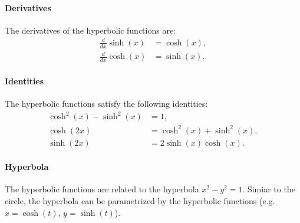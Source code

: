 \documentclass[11pt]{article}
\begin{document}
\paragraph{Derivatives} The derivatives of the hyperbolic functions are:
\begin{align}
    \frac{d}{dx} \sinh(x) &= \cosh(x), \\
    \frac{d}{dx} \cosh(x) &= \sinh(x).
\end{align}
\paragraph{Identities} The hyperbolic functions satisfy the following identities:
\begin{align}
    \cosh^2(x) - \sinh^2(x) &= 1, \\
    \cosh(2x) &= \cosh^2(x) + \sinh^2(x), \\
    \sinh(2x) &= 2\sinh(x)\cosh(x).
\end{align}
\paragraph{Hyperbola} The hyperbolic functions are related to the hyperbola $x^2 - y^2 = 1$. Simiar to the circle, the hyperbola can be parametrized by the hyperbolic functions (e.g. $x = \cosh(t)$, $y = \sinh(t)$).
\end{document}
